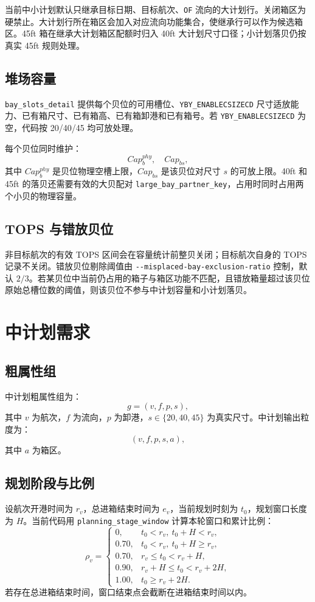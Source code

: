 \documentclass[UTF8,a4paper,11pt]{ctexart}
\newcommand{\code}[1]{\nolinkurl{#1}}
\begin{document}
当前中小计划默认只继承目标日期、目标航次、\code{OF} 流向的大计划行。关闭箱区为硬禁止。大计划行所在箱区会加入对应流向功能集合，使继承行可以作为候选箱区。45ft 箱在继承大计划箱区配额时归入 40ft 大计划尺寸口径；小计划落贝仍按真实 45ft 规则处理。

\subsection{堆场容量}

\code{bay_slots_detail} 提供每个贝位的可用槽位、\code{YBY_ENABLECSIZECD} 尺寸适放能力、已有箱尺寸、已有箱高、已有箱卸港和已有箱号。若 \code{YBY_ENABLECSIZECD} 为空，代码按 20/40/45 均可放处理。

每个贝位同时维护：
\[
Cap_b^{phy},
\quad
Cap_{bs},
\]
其中 \(Cap_b^{phy}\) 是贝位物理空槽上限，\(Cap_{bs}\) 是该贝位对尺寸 \(s\) 的可放上限。40ft 和 45ft 的落贝还需要有效的大贝配对 \code{large_bay_partner_key}，占用时同时占用两个小贝的物理容量。

\subsection{TOPS 与错放贝位}

非目标航次的有效 TOPS 区间会在容量统计前整贝关闭；目标航次自身的 TOPS 记录不关闭。错放贝位剔除阈值由 \code{--misplaced-bay-exclusion-ratio} 控制，默认 \(2/3\)。若某贝位中当前仍占用的箱子与箱区功能不匹配，且错放箱量超过该贝位原始总槽位数的阈值，则该贝位不参与中计划容量和小计划落贝。

\section{中计划需求}

\subsection{粗属性组}

中计划粗属性组为：
\[
g=(v,f,p,s),
\]
其中 \(v\) 为航次，\(f\) 为流向，\(p\) 为卸港，\(s\in\{20,40,45\}\) 为真实尺寸。中计划输出粒度为：
\[
(v,f,p,s,a),
\]
其中 \(a\) 为箱区。

\subsection{规划阶段与比例}

设航次开港时间为 \(r_v\)，总进箱结束时间为 \(e_v\)，当前规划时刻为 \(t_0\)，规划窗口长度为 \(H\)。当前代码用 \code{planning_stage_window} 计算本轮窗口和累计比例：
\[
\rho_v=
\begin{cases}
0, & t_0<r_v,\ t_0+H<r_v,\\
0.70, & t_0<r_v,\ t_0+H\ge r_v,\\
0.70, & r_v\le t_0<r_v+H,\\
0.90, & r_v+H\le t_0<r_v+2H,\\
1.00, & t_0\ge r_v+2H.
\end{cases}
\]
若存在总进箱结束时间，窗口结束点会截断在进箱结束时间以内。
\end{document}
